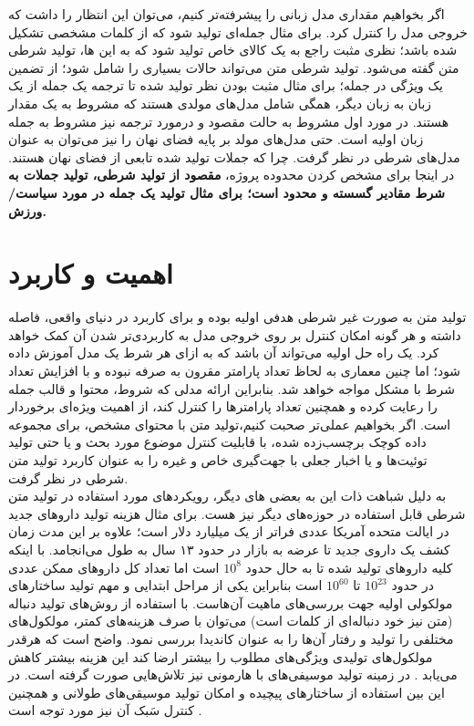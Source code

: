 اگر بخواهیم مقداری \task{} مدل زبانی را پیشرفته‌تر کنیم، می‌توان این انتظار را داشت که خروجی مدل را کنترل کرد. برای مثال جمله‌ای تولید شود که از کلمات مشخصی تشکیل شده باشد؛ نظری مثبت راجع به یک کالای خاص تولید شود که به این \task{}‌ها، تولید شرطی متن گفته می‌شود. تولید شرطی متن می‌تواند حالات بسیاری را شامل شود؛ از تضمین یک ویژگی در جمله؛ برای مثال مثبت بودن نظر تولید شده تا ترجمه یک جمله از یک زبان به زبان دیگر، همگی شامل مدل‌های مولدی هستند که مشروط به یک مقدار هستند. در مورد اول مشروط به حالت مقصود و درمورد ترجمه نیز مشروط به جمله زبان اولیه است. حتی مدل‌های  مولد بر پایه فضای نهان را نیز می‌توان به عنوان مدل‌های شرطی در نظر گرفت. چرا که جملات تولید شده تابعی از فضای نهان هستند. در اینجا برای مشخص کردن محدوده پروژه،
{\bf
مقصود از تولید شرطی، تولید جملات به شرط مقادیر گسسته و محدود است؛ برای مثال تولید یک جمله در مورد سیاست/ورزش.}
\section{اهمیت و کاربرد}
تولید متن به صورت غیر شرطی هدفی اولیه بوده و برای کاربرد در دنیای واقعی، فاصله داشته و هر گونه امکان کنترل بر روی خروجی مدل به کاربردی‌تر شدن آن کمک خواهد کرد. یک راه حل اولیه می‌تواند آن باشد که به ازای هر شرط یک مدل آموزش داده شود؛ اما چنین معماری به لحاظ تعداد پارامتر مقرون به صرفه نبوده و با افزایش تعداد شرط با مشکل مواجه خواهد شد. بنابراین ارائه مدلی  که شروط، محتوا و قالب جمله را رعایت کرده و همچنین تعداد پارامترها را کنترل کند، از اهمیت ویژه‌ای برخوردار است. اگر بخواهیم عملی‌تر صحبت کنیم،تولید متن با محتوای مشخص، 
برای مجموعه داده کوچک برچسب‌زده شده، 
با قابلیت کنترل موضوع مورد بحث و یا حتی تولید توئیت‌ها و یا اخبار جعلی با جهت‌گیری خاص و غیره را به عنوان کاربرد تولید متن شرطی در نظر گرفت.
\\
به دلیل شباهت ذات این \task{} به بعضی \task{}‌های دیگر، رویکردهای مورد استفاده در تولید متن شرطی قابل استفاده در حوزه‌های دیگر نیز هست. برای مثال هزینه تولید دارو‌های جدید در ایالت متحده آمریکا عددی فراتر از یک میلیارد دلار است؛ علاوه بر این مدت زمان کشف یک داروی جدید تا عرضه به بازار در حدود ۱۳ سال به طول می‌انجامد. با اینکه کلیه دارو‌های تولید شده تا به حال حدود $10^8$ است اما تعداد کل دارو‌های ممکن عددی در حدود $10^{23}$ تا $10^{60}$ است بنابراین یکی از مراحل ابتدایی و مهم تولید ساختارهای مولکولی اولیه جهت بررسی‌های ماهیت آن‌هاست. با استفاده از روش‌های تولید دنباله (متن نیز خود دنباله‌ای از کلمات است) می‌توان با صرف هزینه‌های کمتر، مولکول‌های مختلفی را تولید و رفتار آن‌ها را به عنوان کاندیدا بررسی نمود. واضح است که هرقدر مولکول‌های تولیدی ویژگی‌های مطلوب را بیشتر ارضا کند این هزینه بیشتر کاهش می‌یابد \cite{molecule}. در زمینه تولید موسیفی‌های با هارمونی نیز تلاش‌هایی صورت گرفته است. در این بین استفاده از ساختارهای پیچیده و امکان تولید موسیقی‌های طولانی  و همچنین کنترل سَبک آن نیز مورد توجه است \cite{vae_music, music}.

